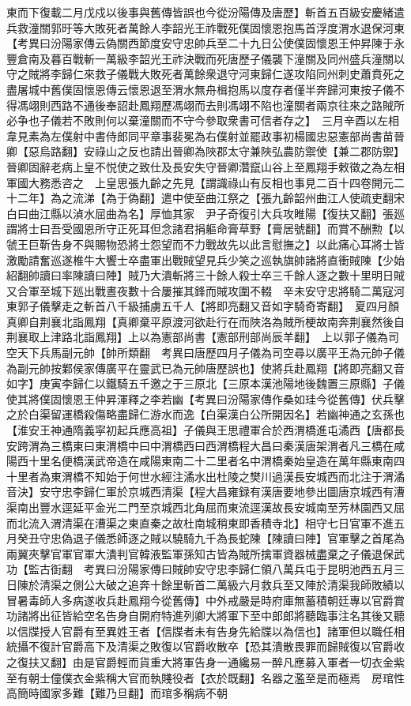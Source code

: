 東而下復載二月戊戍以後事與舊傳皆誤也今從汾陽傳及唐歷】斬首五百級安慶緒遣兵救潼關郭旴等大敗死者萬餘人李韶光王祚戰死僕固懷恩抱馬首浮度渭水退保河東　【考異曰汾陽家傳云偽關西節度安守忠帥兵至二十九日公使僕固懷恩王仲昇陳于永豐倉南及暮百戰斬一萬級李韶光王祚決戰而死唐歷子儀襲下潼關及同州盛兵潼關以守之賊將李歸仁來救子儀戰大敗死者萬餘衆退守河東歸仁遂攻陷同州刺史蕭賁死之盡屠城中舊僕固懷恩傳云懷恩退至渭水無舟楫抱馬以度存者僅半奔歸河東按子儀不得馮翊則西路不通後奉詔赴鳳翔歷馮翊而去則馮翊不陷也潼關者兩京往來之路賊所必争也子儀若不敗則何以棄潼關而不守今參取衆書可信者存之】　三月辛酉以左相韋見素為左僕射中書侍郎同平章事裴冕為右僕射並罷政事初楊國忠惡憲部尚書苗晉卿【惡烏路翻】安祿山之反也請出晉卿為陜郡太守兼陜弘農防禦使【兼二郡防禦】晉卿固辭老病上皇不悦使之致仕及長安失守晉卿濳竄山谷上至鳳翔手敕徵之為左相軍國大務悉咨之　上皇思張九齡之先見【謂識祿山有反相也事見二百十四卷開元二十二年】為之流涕【為于偽翻】遣中使至曲江祭之【張九齡韶州曲江人使疏吏翻宋白曰曲江縣以湞水屈曲為名】厚恤其家　尹子奇復引大兵攻睢陽【復扶又翻】張廵謂將士曰吾受國恩所守正死耳但念諸君捐軀命膏草野【膏居號翻】而賞不酬勲【以虢王巨靳告身不與賜物恐將士怨望而不力戰故先以此言慰撫之】以此痛心耳將士皆激勵請奮巡遂椎牛大饗士卒盡軍出戰賊望見兵少笑之巡執旗帥諸將直衝賊陳【少始紹翻帥讀曰率陳讀曰陣】賊乃大潰斬將三十餘人殺士卒三千餘人逐之數十里明日賊又合軍至城下廵出戰晝夜數十合屢摧其鋒而賊攻圍不輟　辛未安守忠將騎二萬寇河東郭子儀擊走之斬首八千級捕虜五千人【將即亮翻又音如字騎奇寄翻】　夏四月顏真卿自荆襄北詣鳳翔【真卿棄平原渡河欲赴行在而陜洛為賊所梗故南奔荆襄然後自荆襄取上津路北詣鳳翔】上以為憲部尚書【憲部刑部尚辰羊翻】　上以郭子儀為司空天下兵馬副元帥【帥所類翻　考異曰唐歷四月子儀為司空尋以廣平王為元帥子儀為副元帥按鄴侯家傳廣平在靈武已為元帥唐歷誤也】使將兵赴鳳翔【將即亮翻又音如字】庚寅李歸仁以鐵騎五千邀之于三原北【三原本漢池陽地後魏置三原縣】子儀使其將僕固懷恩王仲昇渾釋之李若幽【考異曰汾陽家傳作桑如珪今從舊傳】伏兵擊之於白渠留運橋殺傷略盡歸仁游水而逸【白渠漢白公所開因名】若幽神通之玄孫也【淮安王神通隋義寜初起兵應高祖】子儀與王思禮軍合於西渭橋進屯潏西【唐都長安跨渭為三橋東曰東渭橋中曰中渭橋西曰西渭橋程大昌曰秦漢唐架渭者凡三橋在咸陽西十里名便橋漢武帝造在咸陽東南二十二里者名中渭橋秦始皇造在萬年縣東南四十里者為東渭橋不知始于何世水經注潏水出杜陵之樊川過漢長安城西而北注于渭潏音決】安守忠李歸仁軍於京城西清渠【程大昌雍録有漢唐要地參出圖唐京城西有漕渠南出豐水逕延平金光二門至京城西北角屈而東流逕漢故長安城南至芳林園西又屈而北流入渭清渠在漕渠之東直秦之故杜南城稍東即香積寺北】相守七日官軍不進五月癸丑守忠偽退子儀悉師逐之賊以驍騎九千為長蛇陳【陳讀曰陣】官軍擊之首尾為兩翼夾擊官軍官軍大潰判官韓液監軍孫知古皆為賊所擒軍資器械盡棄之子儀退保武功【監古衘翻　考異曰汾陽家傳曰賊帥安守忠李歸仁領八萬兵屯于昆明池西五月三日陳於清渠之側公大破之追奔十餘里斬首二萬級六月救兵至又陣於清渠我師敗績以冒暑毒師人多病遂收兵赴鳳翔今從舊傳】中外戒嚴是時府庫無蓄積朝廷專以官爵賞功諸將出征皆給空名告身自開府特進列卿大將軍下至中郎郎將聽臨事注名其後又聽以信牒授人官爵有至異姓王者【信牒者未有告身先給牒以為信也】諸軍但以職任相統攝不復計官爵高下及清渠之敗復以官爵收散卒【恐其潰散畏罪而歸賊復以官爵收之復扶又翻】由是官爵輕而貨重大將軍告身一通纔易一醉凡應募入軍者一切衣金紫至有朝士僮僕衣金紫稱大官而執賤役者【衣於既翻】名器之濫至是而極焉　房琯性高簡時國家多難【難乃旦翻】而琯多稱病不朝